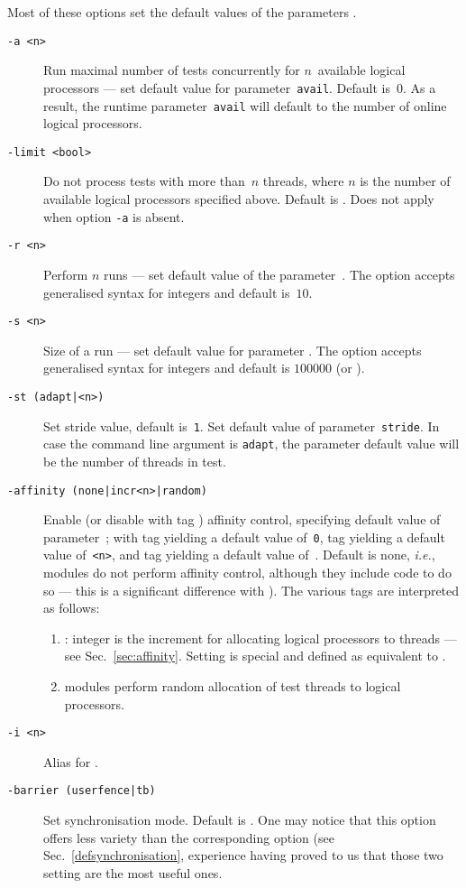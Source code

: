 Most of these options set the default values of the parameters
.
\begin{description}
\item[{\tt -a <n>}]Run maximal number of tests concurrently for $n$~available
logical processors ---
set default value for parameter~\texttt{avail}.
Default is~$0$. As a result,
the runtime parameter~\texttt{avail}
will default to the number of online logical processors.
\item[{\tt -limit <bool>}] Do not process tests with more than~$n$
threads, where $n$ is the number of available logical processors
specified above. Default is .
Does not apply  when option \texttt{-a} is absent.
\item[{\tt -r <n>}] Perform $n$ runs --- set default value
of the parameter~.
The option accepts generalised syntax for integers and
default is~$10$.
\item[{\tt -s <n>}]Size of a run --- set default value for
parameter .
The option accepts generalised syntax for integers and
default is $100000$ (or ).
\item[{\tt -st (adapt|<n>)}]
Set stride value, default is~\texttt{1}.
Set default value of parameter~\texttt{stride}.
In case the command line argument is \texttt{adapt}, the parameter default
value will be the number of threads in test.

\item[{\tt -affinity (none|incr<n>|random)}]
Enable (or disable with tag ) affinity control,
specifying default value of parameter~;
with tag  yielding a default value of~\texttt{0},
tag  yielding a default value of~\texttt{<n>},
and tag  yielding a default value of~.
Default is none, \emph{i.e.}, modules do not perform affinity control,
although they include code to do so ---
this is a significant difference with
).
The various tags are interpreted as follows:
\begin{enumerate}
\item {}:
integer  is the increment  for allocating logical
processors to threads --- see Sec.~\ref{sec:affinity}.
Setting  is special and defined as
equivalent to .
\item {} modules perform random allocation of
test threads to logical processors.
\end{enumerate}
\item[{\tt -i <n>}] Alias for .

\item[{\tt -barrier (userfence|tb)}]
Set synchronisation mode. Default is .
One may notice that this option offers less variety than
the corresponding \litmus{} option (see Sec.~\ref{defsynchronisation},
experience having proved to us
that those two setting are the most useful ones.
\end{description}

